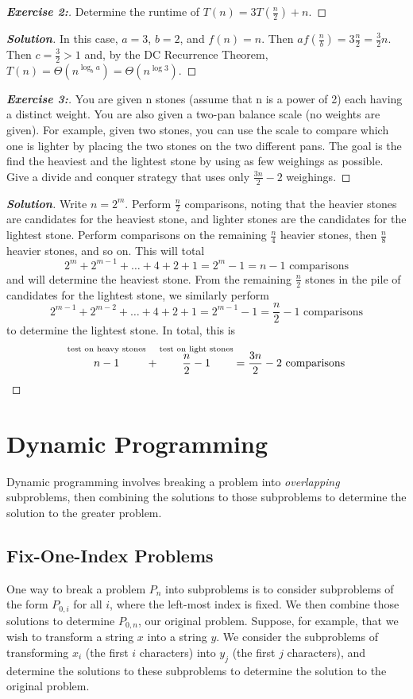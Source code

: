 \documentclass[a4paper]{article}
\newenvironment{solution}{\begin{proof}[\textnormal{\textbf{Solution}}]}{\end{proof}}
\newenvironment{exercise}[1]{\begin{proof}[\textnormal{\textbf{Exercise #1:}}]\phantom{\qedhere}}{\end{proof}}
\theoremstyle{definition}
\begin{document}
\begin{exercise}{2}
 Determine the runtime of $T(n)=3T(\frac{n}{2})+n$.
\end{exercise}

\begin{solution}
 In this case, $a=3$, $b=2$, and $f(n)=n$. Then $af(\frac{n}{b})=3\frac{n}{2}=\frac{3}{2}n$. Then $c=\frac{3}{2}>1$ and, by the DC Recurrence Theorem, $T(n)=\Theta(n^{\log_ba})=\Theta(n^{\log{3}})$.
\end{solution}

\begin{exercise}{3}
You are given n stones (assume that n is a power of 2) each having a distinct weight. You are also given a two-pan balance scale (no weights are given). For example, given two stones, you can use the scale to compare which one is lighter by placing the two stones on the two different pans. The goal is the find the heaviest and the lightest stone by using as few weighings as possible. Give a divide and conquer strategy that uses only $\frac{3n}{2}-2$ weighings.
\end{exercise}

\begin{solution}
 Write $n=2^m$. Perform $\frac{n}{2}$ comparisons, noting that the heavier stones are candidates for the heaviest stone, and lighter stones are the candidates for the lightest stone. Perform comparisons on the remaining $\frac{n}{4}$ heavier stones, then $\frac{n}{8}$ heavier stones, and so on. This will total \[2^m+2^{m-1}+\hdots+4+2+1=2^m-1=n-1 \text{ comparisons}\] and will determine the heaviest stone. From the remaining $\frac{n}{2}$ stones in the pile of candidates for the lightest stone, we similarly perform \[2^{m-1}+2^{m-2}+\hdots+4+2+1=2^{m-1}-1=\frac{n}{2}-1 \text{ comparisons}\] to determine the lightest stone. In total, this is \[\overset{\text{test on heavy stones}}{\vphantom{\frac{n}{2}}n-1} + \overset{\text{test on light stones}}{\frac{n}{2}-1}=\frac{3n}{2}-2\text{ comparisons}\]
 \end{solution}

 \section{Dynamic Programming}
 Dynamic programming involves breaking a problem into \textit{overlapping} subproblems, then combining the solutions to those subproblems to determine the solution to the greater problem. 
\subsection{Fix-One-Index Problems}
One way to break a problem $P_n$ into subproblems is to consider subproblems of the form $P_{0,i}$ for all $i$, where the left-most index is fixed. We then combine those solutions to determine $P_{0,n}$, our original problem. Suppose, for example, that we wish to transform a string $x$ into a string $y$. We consider the subproblems of transforming $x_i$ (the first $i$ characters) into $y_j$ (the first $j$ characters), and determine the solutions to these subproblems to determine the solution to the original problem. 
\end{document}
